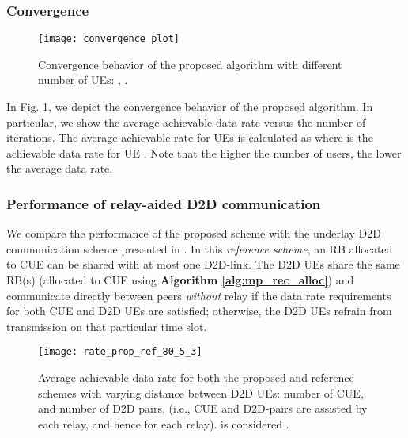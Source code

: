 \documentclass[twocolumn,10pt]{IEEEtran}
\begin{document}
\subsubsection{Convergence} 

\begin{figure}
\centering
\texttt{[image: convergence\_plot]}
\caption{Convergence behavior of the proposed algorithm with different number of UEs:  , .}
\label{fig:convergence_mp}
\end{figure}

In Fig. \ref{fig:convergence_mp}, we depict the convergence behavior of the proposed algorithm. In particular, we show the average achievable data
rate versus the number of iterations. The average achievable rate  for UEs is calculated as  where  is the achievable data rate for UE . Note that the higher
the number of users, the lower the average data rate.

\subsubsection{Performance of relay-aided D2D communication}

We compare the performance of the proposed scheme with the underlay D2D communication scheme presented in \cite{zul-d2d}. In this  \textit{reference scheme}, an RB allocated to CUE can be shared with at most one D2D-link. The D2D UEs share the same RB(s) (allocated to CUE using \textbf{Algorithm \ref{alg:mp_rec_alloc}}) and communicate directly between peers \textit{without} relay if the data rate requirements for both CUE and D2D UEs are satisfied; otherwise, the D2D UEs refrain from transmission on that particular time slot.


\begin{figure}
\centering
\texttt{[image: rate\_prop\_ref\_80\_5\_3]}
\caption{Average achievable data rate for both the proposed and reference schemes with varying distance between D2D UEs: number of CUE,   and number of D2D pairs,   (i.e.,  CUE and  D2D-pairs are assisted by each relay, and hence  for each relay).   is considered . } 
\label{fig:rate_05_03_mp}
\end{figure}

\begin{figure*}
\centering
{}
\hfil 
{} 
\caption{(a)  Gain in aggregated achievable data rate and (b) Comparing gain with asymptotic upper bound using  the similar setup of Fig. \ref{fig:rate_05_03_mp}. There is a critical distance, beyond which relaying of D2D traffic provides significant performance gain.}
\label{fig:rate_gain_mp}
\end{figure*}
\end{document}
